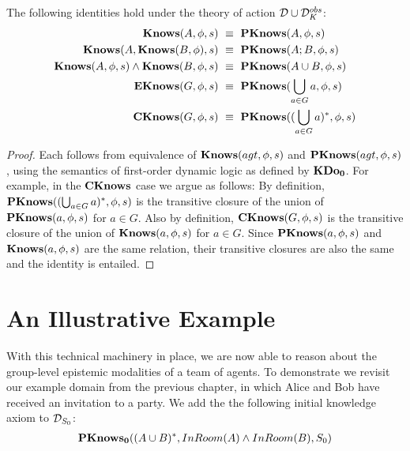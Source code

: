 \begin{thm}
The following identities hold under the theory of action $\mathcal{D}\cup\mathcal{D}_{K}^{obs}$:\begin{align*}
\mathbf{Knows}(A,\phi,s) & \,\,\equiv\,\,\mathbf{PKnows}(A,\phi,s)\\
\mathbf{Knows}(A,\mathbf{Knows}(B,\phi),s) & \,\,\equiv\,\,\mathbf{PKnows}(A;B,\phi,s)\\
\mathbf{Knows}(A,\phi,s)\wedge\mathbf{Knows}(B,\phi,s) & \,\,\equiv\,\,\mathbf{PKnows}(A\cup B,\phi,s)\\
\mathbf{EKnows}(G,\phi,s) & \,\,\equiv\,\,\mathbf{PKnows}(\bigcup_{a\in G}a,\phi,s)\\
\mathbf{CKnows}(G,\phi,s) & \,\,\equiv\,\,\mathbf{PKnows}((\bigcup_{a\in G}a)^{*},\phi,s)\end{align*}

\end{thm}
\begin{proof}
Each follows from equivalence of $\mathbf{Knows}(agt,\phi,s)$ and $\mathbf{PKnows}(agt,\phi,s)$,
using the semantics of first-order dynamic logic as defined by $\mathbf{KDo_{0}}$.
For example, in the $\mathbf{CKnows}$ case we argue as follows: By definition,
$\mathbf{PKnows}((\bigcup_{a\in G}a)^{*},\phi,s)$ is the transitive closure
of the union of $\mathbf{PKnows}(a,\phi,s)$ for $a\in G$. Also by definition,
$\mathbf{CKnows}(G,\phi,s)$ is the transitive closure of the union of $\mathbf{Knows}(a,\phi,s)$
for $a\in G$. Since $\mathbf{PKnows}(a,\phi,s)$ and $\mathbf{Knows}(a,\phi,s)$
are the same relation, their transitive closures are also the same
and the identity is entailed. 
\end{proof}

\section{An Illustrative Example\label{sec:CKnowledge:Example}}

With this technical machinery in place, we are now able to reason
about the group-level epistemic modalities of a team of agents. To
demonstrate we revisit our example domain from the previous chapter,
in which Alice and Bob have received an invitation to a party. We
add the the following initial knowledge axiom to $\mathcal{D}_{S_{0}}$:\begin{gather*}
\mathbf{PKnows_{0}}((A\cup B)^{*},InRoom(A)\wedge InRoom(B),S_{0})\end{gather*}


